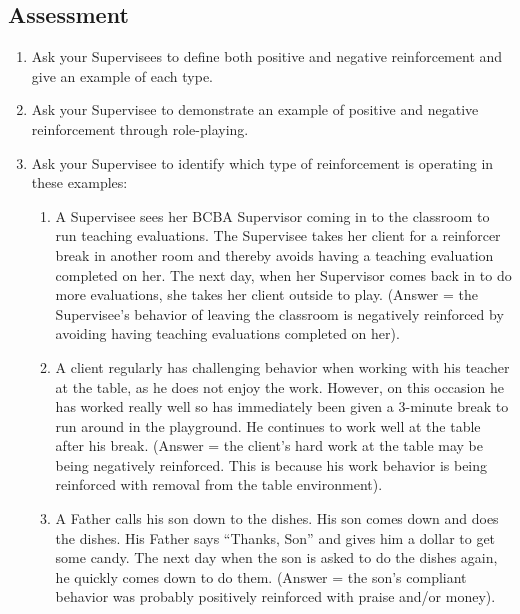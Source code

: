 \subsection{Assessment}
\begin{enumerate}
\item Ask your Supervisees to define both positive and negative reinforcement and give an example of each type.
\item Ask your Supervisee to demonstrate an example of positive and negative reinforcement through role-playing.
\item Ask your Supervisee to identify which type of reinforcement is operating in these examples:
\begin{enumerate}
\item A Supervisee sees her BCBA Supervisor coming in to the classroom to run teaching evaluations. The Supervisee takes her client for a reinforcer break in another room and thereby avoids having a teaching evaluation completed on her. The next day, when her Supervisor comes back in to do more evaluations, she takes her client outside to play. (Answer = the Supervisee's behavior of leaving the classroom is negatively reinforced by avoiding having teaching evaluations completed on her).
\item A client regularly has challenging behavior when working with his teacher at the table, as he does not enjoy the work. However, on this occasion he has worked really well so has immediately been given a 3-minute break to run around in the playground. He continues to work well at the table after his break. (Answer = the client's hard work at the table may be being negatively reinforced. This is because his work behavior is being reinforced with removal from the table environment). 
\item A Father calls his son down to the dishes. His son comes down and does the dishes. His Father says ``Thanks, Son'' and gives him a dollar to get some candy. The next day when the son is asked to do the dishes again, he quickly comes down to do them. (Answer = the son's compliant behavior was probably positively reinforced with praise and/or money).
\end{enumerate}
\end{enumerate}
%
